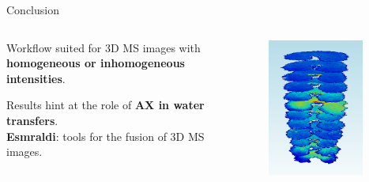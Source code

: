 \documentclass[10pt]{beamer}
\begin{document}
\begin{frame}{Conclusion}

  \begin{columns}
    \begin{column}{.8\textwidth}

      Workflow suited for 3D MS images with \textbf{homogeneous or inhomogeneous intensities}. \\
      \begin{spacing}{1.5}

        Results hint at the role of \textbf{AX in water transfers}.\\

        \textbf{Esmraldi}: tools for the fusion of 3D MS images\footnotemark.
      \end{spacing}
    \end{column}

    \begin{column}{.2\textwidth}
      \begin{figure}[ht]
        \centering
        \includegraphics[width=0.9\textwidth]{fig/3D_250DJ}
      \end{figure}


\end{column}
\end{columns}
\end{frame}
\end{document}
